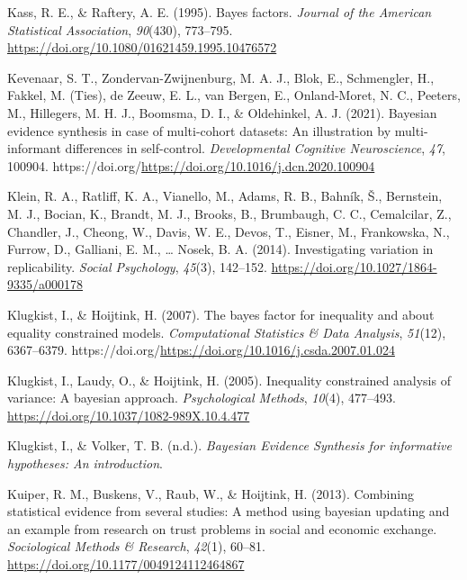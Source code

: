 \documentclass[
]{interact}
\newlength{\cslhangindent}
\newlength{\cslentryspacingunit} %
\newenvironment{CSLReferences}[2] %
 {%
  \setlength{\parindent}{0pt}
  \ifodd #1
  \let\oldpar\par
  \def\par{\hangindent=\cslhangindent\oldpar}
  \fi
  \setlength{\parskip}{#2\cslentryspacingunit}
 }%
 {}
\begin{document}
\begin{CSLReferences}{1}{0}
\leavevmode{}%
Kass, R. E., \& Raftery, A. E. (1995). Bayes factors. \emph{Journal of
the American Statistical Association}, \emph{90}(430), 773--795.
\url{https://doi.org/10.1080/01621459.1995.10476572}

\leavevmode{}%
Kevenaar, S. T., Zondervan-Zwijnenburg, M. A. J., Blok, E., Schmengler,
H., Fakkel, M. (Ties), de Zeeuw, E. L., van Bergen, E., Onland-Moret, N.
C., Peeters, M., Hillegers, M. H. J., Boomsma, D. I., \& Oldehinkel, A.
J. (2021). Bayesian evidence synthesis in case of multi-cohort datasets:
An illustration by multi-informant differences in self-control.
\emph{Developmental Cognitive Neuroscience}, \emph{47}, 100904.
https://doi.org/\url{https://doi.org/10.1016/j.dcn.2020.100904}

\leavevmode{}%
Klein, R. A., Ratliff, K. A., Vianello, M., Adams, R. B., Bahník, Š.,
Bernstein, M. J., Bocian, K., Brandt, M. J., Brooks, B., Brumbaugh, C.
C., Cemalcilar, Z., Chandler, J., Cheong, W., Davis, W. E., Devos, T.,
Eisner, M., Frankowska, N., Furrow, D., Galliani, E. M., \ldots{} Nosek,
B. A. (2014). Investigating variation in replicability. \emph{Social
Psychology}, \emph{45}(3), 142--152.
\url{https://doi.org/10.1027/1864-9335/a000178}

\leavevmode{}%
Klugkist, I., \& Hoijtink, H. (2007). The bayes factor for inequality
and about equality constrained models. \emph{Computational Statistics \&
Data Analysis}, \emph{51}(12), 6367--6379.
https://doi.org/\url{https://doi.org/10.1016/j.csda.2007.01.024}

\leavevmode{}%
Klugkist, I., Laudy, O., \& Hoijtink, H. (2005). Inequality constrained
analysis of variance: A bayesian approach. \emph{Psychological Methods},
\emph{10}(4), 477--493. \url{https://doi.org/10.1037/1082-989X.10.4.477}

\leavevmode{}%
Klugkist, I., \& Volker, T. B. (n.d.). \emph{{B}ayesian {E}vidence
{S}ynthesis for informative hypotheses: An introduction}.

\leavevmode{}%
Kuiper, R. M., Buskens, V., Raub, W., \& Hoijtink, H. (2013). Combining
statistical evidence from several studies: A method using bayesian
updating and an example from research on trust problems in social and
economic exchange. \emph{Sociological Methods \& Research},
\emph{42}(1), 60--81. \url{https://doi.org/10.1177/0049124112464867}


\end{CSLReferences}
\end{document}
